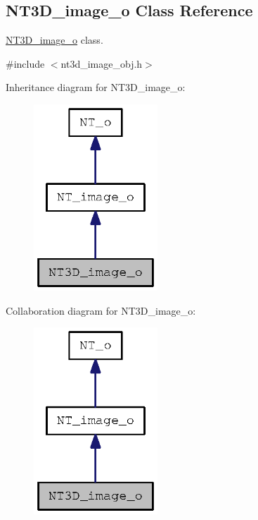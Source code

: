 \subsection{NT3D\_\-image\_\-o Class Reference}
\label{class_n_t3_d__image__o}


\hyperlink{class_n_t3_d__image__o}{NT3D\_\-image\_\-o} class.  




{\ttfamily \#include $<$nt3d\_\-image\_\-obj.h$>$}



Inheritance diagram for NT3D\_\-image\_\-o:
\nopagebreak
\begin{figure}[H]
\begin{center}
\leavevmode
\includegraphics[width=132pt]{class_n_t3_d__image__o__inherit__graph}
\end{center}
\end{figure}


Collaboration diagram for NT3D\_\-image\_\-o:
\nopagebreak
\begin{figure}[H]
\begin{center}
\leavevmode
\includegraphics[width=132pt]{class_n_t3_d__image__o__coll__graph}
\end{center}
\end{figure}
